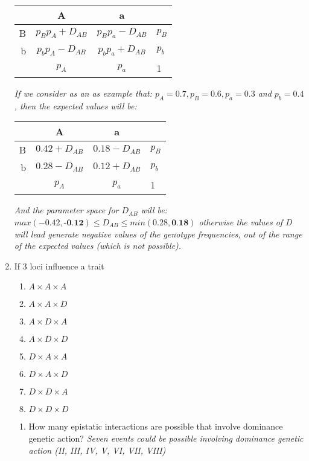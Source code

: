 \documentclass[12pt,a4paper]{paper}
\begin{document}
\begin{enumerate}
\begin{center}
\begin{tabular}{|r||c|c||l|}
\hline
&A&a&\\
\hline
\hline
B&$p_{B}p_{A}+D_{AB}$&$p_{B}p_{a}-D_{AB}$&$p_{B}$\\
\hline
b&$p_{b}p_{A}-D_{AB}$&$p_{b}p_{a}+D_{AB}$&$p_{b}$\\
\hline
\hline
&$p_{A}$&$p_{a}$&1\\
\hline
\end{tabular}
\end{center}
\textit{If we consider as an as example that: $p_{A} = 0.7,  p_{B} = 0.6, p_{a} = 0.3$ and  $p_{b} = 0.4$, then the expected values will be:}
\begin{center}
\begin{tabular}{|r||c|c||l|}
\hline
&A&a&\\
\hline
\hline
B&$0.42+D_{AB}$&$0.18-D_{AB}$&$p_{B}$\\
\hline
b&$0.28-D_{AB}$&$0.12+D_{AB}$&$p_{b}$\\
\hline
\hline
&$p_{A}$&$p_{a}$&1\\
\hline
\end{tabular}
\end{center}
\textit{And the parameter space for $D_{AB}$ will be: $max\left(-0.42,\textbf{-0.12}\right) \leq D_{AB} \leq min\left(0.28,\textbf{0.18}\right)$ otherwise the values of D will lead generate negative values of the genotype frequencies, out of the range of the expected values (which is not possible).}
\item If 3 loci influence a trait
\begin{enumerate}[label=(\roman*)]
\item $A \times A \times A$
\item $A \times A \times D$
\item $A \times D \times A$
\item $A \times D \times D$
\item $D \times A \times A$
\item $D \times A \times D$
\item $D \times D \times A$
\item $D \times D \times D$
\end{enumerate}
\begin{enumerate}
\item How many epistatic interactions are possible that involve dominance genetic action? \textit{Seven events could be possible involving dominance genetic action (II, III, IV, V, VI, VII, VIII)}

\end{enumerate}
\end{enumerate}
\end{document}
